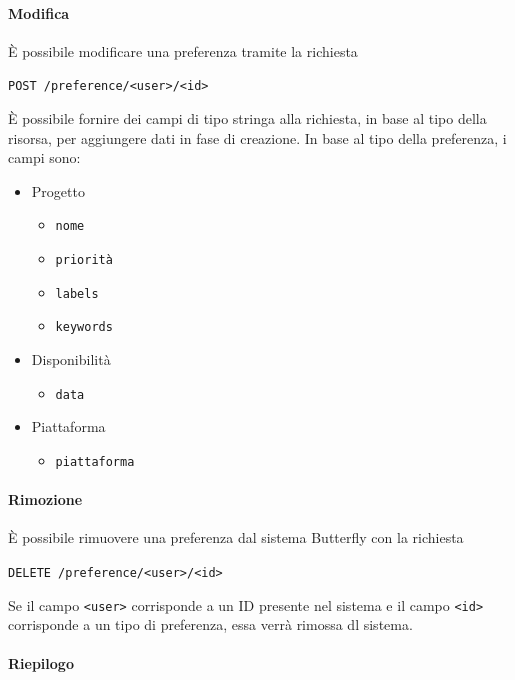 \paragraph{Modifica}

È possibile modificare una preferenza tramite la richiesta
\begin{center}
    \texttt{POST /preference/<user>/<id>}
\end{center}


È possibile fornire dei campi di tipo stringa alla richiesta, in base al tipo della risorsa, per aggiungere dati in fase di creazione.
In base al tipo della preferenza, i campi sono:
\begin{itemize}[noitemsep]
    \item Progetto
        \begin{itemize}[noitemsep]
            \item \texttt{nome}
            \item \texttt{priorità}
            \item \texttt{labels}
            \item \texttt{keywords}
        \end{itemize}
    \item Disponibilità
        \begin{itemize}[noitemsep]
            \item \texttt{data}
        \end{itemize}
    \item Piattaforma
        \begin{itemize}[noitemsep]
            \item \texttt{piattaforma}
        \end{itemize}
\end{itemize}


\paragraph{Rimozione}

È possibile rimuovere una preferenza dal sistema Butterfly con la richiesta
\begin{center}
    \texttt{DELETE /preference/<user>/<id>}
\end{center}

Se il campo \texttt{<user>} corrisponde a un ID presente nel sistema e il campo \texttt{<id>} corrisponde a un tipo di preferenza, essa verrà rimossa dl sistema.

\paragraph{Riepilogo}

